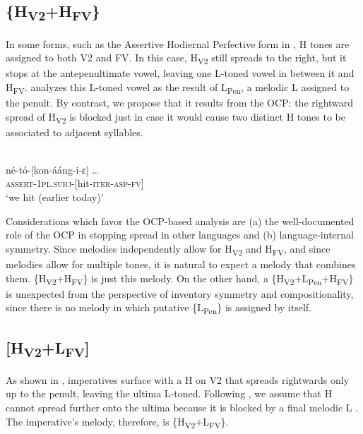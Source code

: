 \documentclass[output=paper
,newtxmath
,modfonts
,nonflat]{langsci/langscibook}
\begin{document}
\subsection{\{H\textsubscript{V2}+H\textsubscript{FV}\}}
\label{bkm:Ref359188838}
In some forms, such as the Assertive Hodiernal Perfective form in , H tones are assigned to both V2 and FV. In this case, H\textsubscript{V2} still spreads to the right, but it stops at the antepenultimate vowel, leaving one L-toned vowel in between it and H\textsubscript{FV}. \citet{Roberts-Kohno2014} analyzes this L-toned vowel as the result of L\textsubscript{Pen}, a melodic L  assigned to the penult. By contrast, we propose that it results from the OCP: the rightward spread of H\textsubscript{V2} is blocked just in case it would cause two distinct H tones to be associated to adjacent syllables.

\ea\label{ex:jones:5}
\\
\gll né-tó-[kon-ááng-i-ɛ] …\\
     \textsc{assert-1pl.subj-[}hit-\textsc{iter-asp-fv]}\\
\glt ‘we hit (earlier today)’
\z

Considerations which favor the OCP-based analysis are (a) the well-doc\-u\-ment\-ed role of the OCP in stopping  spread in other  languages \citep[e.g.][]{Myers1997,Odden2014} and (b) language-internal symmetry. Since  melodies independently allow for H\textsubscript{V2} and H\textsubscript{FV}, and since  melodies allow for multiple tones, it is natural to expect a melody that combines them. \{H\textsubscript{V2}+H\textsubscript{FV}\} is just this melody. On the other hand, a \{H\textsubscript{V2}+L\textsubscript{Pen}+H\textsubscript{FV}\} is unexpected from the perspective of inventory symmetry and compositionality, since there is no melody in which putative \{L\textsubscript{Pen}\} is assigned by itself.


\subsection{[H\textsubscript{V2}+L\textsubscript{FV}]}

\label{bkm:Ref359196042}
As shown in ,  imperatives surface with a H  on V2 that spreads rightwards only up to the penult, leaving the ultima L-toned. Following \citet{Roberts-Kohno2014}, we assume that H cannot spread further onto the ultima because it is blocked by a final melodic L . The imperative’s melody, therefore, is \{H\textsubscript{V2}+L\textsubscript{FV}\}.
\end{document}
